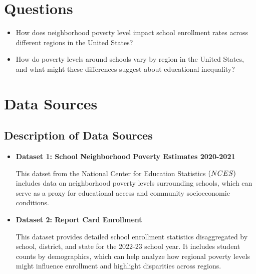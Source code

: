 \documentclass[a4paper,11pt]{article}
\begin{document}
\section{Questions}
    \begin{itemize}
        \item How does neighborhood poverty level impact school enrollment rates across different regions in the United States?
    
        \item How do poverty levels around schools vary by region in the United States, and what might these differences suggest about educational inequality?
    \end{itemize}

\section{Data Sources}
    \subsection{Description of Data Sources}
        \begin{itemize}
            \item \textbf{Dataset 1: School Neighborhood Poverty Estimates 2020-2021}
    
            This datset from the National Center for Education Statistics \(\text(NCES)\) includes data on neighborhood poverty levels surrounding schools, which can serve as a proxy for educational access and community socioeconomic conditions. \cite{dataset1}

            \item \textbf{Dataset 2: Report Card Enrollment}

            This dataset provides detailed school enrollment statistics disaggregated by school, district, and state for the 2022-23 school year. It includes student counts by demographics, which can help analyze how regional poverty levels might influence enrollment and highlight disparities across regions. \cite{dataset2}
        \end{itemize}
\end{document}
